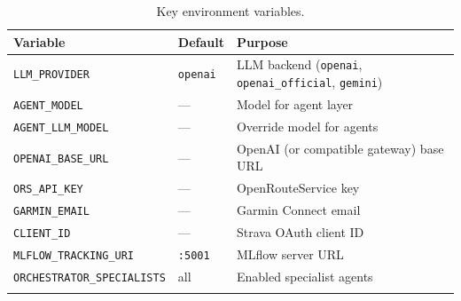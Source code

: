 \begin{table}[ht]
\begin{center}
\begin{minipage}{\textwidth}
\caption{Key environment variables.}\label{tab:env}
\begin{tabularx}{\textwidth}{lp{2cm}X}
\toprule
\textbf{Variable} & \textbf{Default} & \textbf{Purpose} \\
\midrule
\texttt{LLM\_PROVIDER} & \texttt{openai} & LLM backend (\texttt{openai}, \texttt{openai\_official}, \texttt{gemini}) \\
\texttt{AGENT\_MODEL} & --- & Model for agent layer \\
\texttt{AGENT\_LLM\_MODEL} & --- & Override model for agents \\
\texttt{OPENAI\_BASE\_URL} & --- & OpenAI (or compatible gateway) base URL \\
\texttt{ORS\_API\_KEY} & --- & OpenRouteService key \\
\texttt{GARMIN\_EMAIL} & --- & Garmin Connect email \\
\texttt{CLIENT\_ID} & --- & Strava OAuth client ID \\
\texttt{MLFLOW\_TRACKING\_URI} & \texttt{:5001} & MLflow server URL \\
\texttt{ORCHESTRATOR\_SPECIALISTS} & all & Enabled specialist agents \\
\botrule
\end{tabularx}
\end{minipage}
\end{center}
\end{table}
